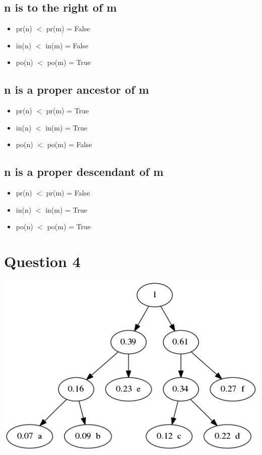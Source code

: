 \documentclass{article}
\begin{document}
\subsection*{n is to the right of m}
\begin{itemize}
\item pr(n) $<$ pr(m) = False
\item in(n) $<$ in(m) = False
\item po(n) $<$ po(m) = True
\end{itemize}

\subsection*{n is a proper ancestor of m}
\begin{itemize}
\item pr(n) $<$ pr(m) = True
\item in(n) $<$ in(m) = True
\item po(n) $<$ po(m) = False
\end{itemize}

\subsection*{n is a proper descendant of m}
\begin{itemize}
\item pr(n) $<$ pr(m) = False
\item in(n) $<$ in(m) = True
\item po(n) $<$ po(m) = True
\end{itemize}

\section*{Question 4}
\includegraphics[scale=0.5]{bTree.png}
\end{document}
